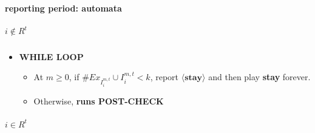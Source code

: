 \documentclass[12pt,letter]{article}
\theoremstyle{definition}
\theoremstyle{remark}
\theoremstyle{claim}
\begin{document}
\paragraph{reporting period: automata}
\subparagraph{$i\notin R^{t}$}




\begin{itemize}
\item \textbf{WHILE LOOP}
\begin{itemize}
\item At $m\geq 0$, if $\#Ex_{I^{m,t}_i}\cup I^{m,t}_i< k$, report $\langle \textbf{stay} \rangle$ and then play \textbf{stay} forever.
\item Otherwise, \textbf{runs POST-CHECK }
\end{itemize}
\end{itemize}

\subparagraph{$i\in R^{t}$}
\end{document}
